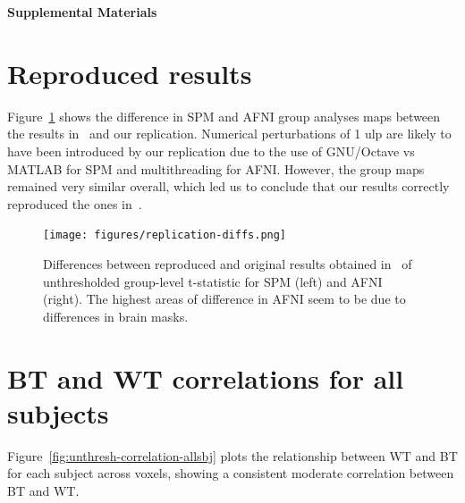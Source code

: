\documentclass[11pt,onecolumn]{article}
\begin{document}
\setcounter{equation}{0}
\setcounter{figure}{0}
\setcounter{table}{0}
\setcounter{section}{0}

\makeatletter
\renewcommand{\theequation}{S\arabic{equation}}
\renewcommand{\thefigure}{S\arabic{figure}}
\renewcommand{\thesection}{S\arabic{section}}

\textbf{\centering \Large Supplemental Materials}

\section{Reproduced results}
\label{sec:supp-repro}

Figure~\ref{fig:replication-diff} shows the difference in SPM and AFNI
group analyses maps between the results in~\cite{bowring2019exploring} and
our replication. Numerical perturbations of 1 ulp are likely to have been
introduced by our replication due to the use of GNU/Octave vs MATLAB for SPM
and multithreading for AFNI.
  However, the group maps remained very similar
overall, which led us to conclude that our results correctly reproduced
the ones in~\cite{bowring2019exploring}.
\begin{figure}[ht]
  \texttt{[image: figures/replication-diffs.png]}
  \caption{Differences between reproduced and original results obtained in~\cite{bowring2019exploring}
    of unthresholded group-level t-statistic for SPM (left) and AFNI
    (right). The highest areas of difference in AFNI seem to be due to
    differences in brain masks.}
  \label{fig:replication-diff}
\end{figure}

\section{BT and WT correlations for all subjects}
\label{sec:supp-subjects}

Figure~\ref{fig:unthresh-correlation-allsbj} plots the relationship between
WT and BT for each subject across voxels, showing a consistent moderate correlation between BT and
WT.
\end{document}
